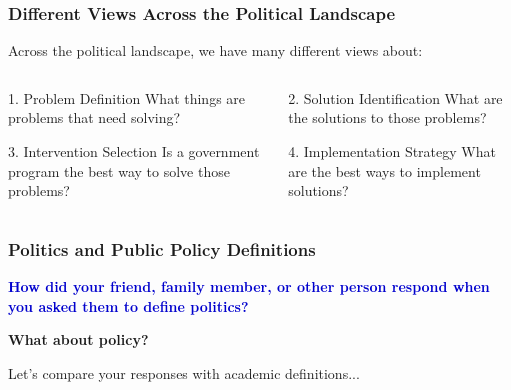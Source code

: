 \documentclass[10pt]{beamer}
\begin{document}
\begin{frame}
\frametitle{Different Views Across the Political Landscape}

\begin{alertblock}{}
Across the political landscape, we have many different views about:
\end{alertblock}

\vspace{0.5cm}

\begin{columns}
\begin{column}{0.48\textwidth}
\begin{block}{1. Problem Definition}
What things are problems that need solving?
\end{block}

\vspace{0.3cm}

\begin{block}{3. Intervention Selection}
Is a government program the best way to solve those problems?
\end{block}
\end{column}

\begin{column}{0.48\textwidth}
\begin{block}{2. Solution Identification}
What are the solutions to those problems?
\end{block}

\vspace{0.3cm}

\begin{block}{4. Implementation Strategy}
What are the best ways to implement solutions?
\end{block}
\end{column}
\end{columns}

\end{frame}

\begin{frame}
\frametitle{Politics and Public Policy Definitions}

\begin{block}{}
\centering
\textcolor{mediumblue}{\textbf{How did your friend, family member, or other person respond when you asked them to define politics?}}

\vspace{0.5cm}

\textcolor{titanblue}{\textbf{What about policy?}}
\end{block}

\vspace{1cm}
\pause
\centering
Let's compare your responses with academic definitions...

\end{frame}
\end{document}
